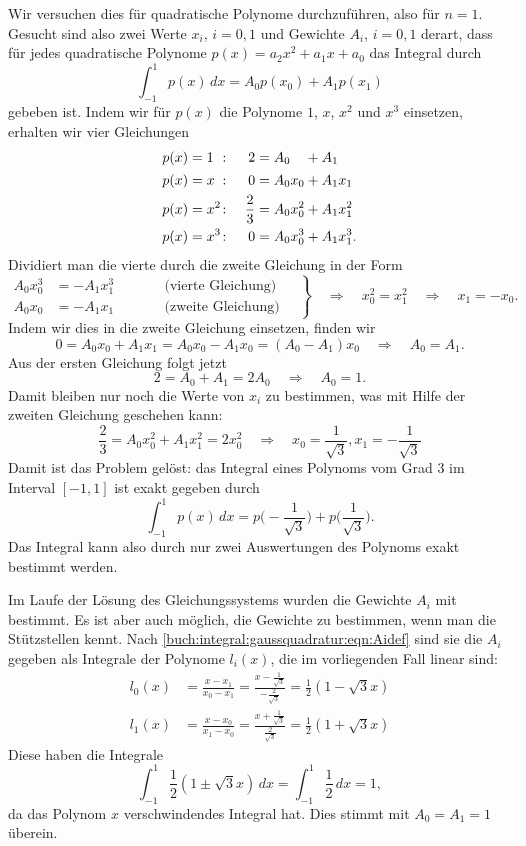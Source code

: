 \begin{beispiel}
Wir versuchen dies für quadratische Polynome durchzuführen, also 
für $n=1$.
Gesucht sind also zwei Werte $x_i$, $i=0,1$ und Gewichte $A_i$, $i=0,1$
derart, dass für jedes quadratische Polynome $p(x)=a_2x^2+a_1x+a_0$ 
das Integral durch
\[
\int_{-1}^1 p(x)\,dx
=
A_0 p(x_0) + A_1 p(x_1)
\]
gebeben ist.
Indem wir für $p(x)$ die Polynome $1$, $x$, $x^2$ und $x^3$ einsetzen,
erhalten wir vier Gleichungen
\[
\begin{aligned}
p(x)&=\rlap{$1$}\phantom{x^2}\colon& 2       &= A_0\phantom{x_0}+ A_1     \\
p(x)&=x^{\phantom{2}}\colon& 0       &= A_0x_0   + A_1x_1  \\
p(x)&=x^2\colon& \frac23 &= A_0x_0^2 + A_1x_1^2\\
p(x)&=x^3\colon& 0       &= A_0x_0^3 + A_1x_1^3.
\end{aligned}
\]
Dividiert man die vierte durch die zweite Gleichung in der Form
\[
\left.
\begin{aligned}
A_0x_0^3 &= -A_1x_1^3 &\qquad&\text{(vierte Gleichung)}\\
A_0x_0   &= -A_1x_1   &\qquad&\text{(zweite Gleichung)}
\end{aligned}
\quad
\right\}
\quad
\Rightarrow
\quad
x_0^2=x_1^2
\quad
\Rightarrow
\quad
x_1=-x_0.
\]
Indem wir dies in die zweite Gleichung einsetzen, finden wir 
\[
0 = A_0x_0 + A_1x_1 = A_0x_0 -A_1x_0 = (A_0-A_1)x_0
\quad\Rightarrow\quad
A_0=A_1.
\]
Aus der ersten Gleichung folgt jetzt
\[
2= A_0+A_1 = 2A_0 \quad\Rightarrow\quad A_0 = 1.
\]
Damit bleiben nur noch die Werte von $x_i$ zu bestimmen, was 
mit Hilfe der zweiten Gleichung geschehen kann:
\[
\frac23 = A_0x_0^2 + A_1x_1^2 = 2x_0^2
\quad\Rightarrow\quad
x_0 = \frac{1}{\sqrt{3}}, x_1 = -\frac{1}{\sqrt{3}}
\]
Damit ist das Problem gelöst: das Integral eines Polynoms vom Grad 3
im Interval $[-1,1]$ ist exakt gegeben durch
\[
\int_{-1}^1 p(x)\,dx
=
p\biggl(-\frac{1}{\sqrt{3}}\biggr)
+
p\biggl(\frac{1}{\sqrt{3}}\biggr).
\]
Das Integral kann also durch nur zwei Auswertungen des Polynoms
exakt bestimmt werden.

Im Laufe der Lösung des Gleichungssystems wurden die Gewichte $A_i$
mit bestimmt.
Es ist aber auch möglich, die Gewichte zu bestimmen, wenn man die
Stützstellen kennt.
Nach \eqref{buch:integral:gaussquadratur:eqn:Aidef}
sind sie die $A_i$ gegeben als Integrale der Polynome
$l_i(x)$, die im vorliegenden Fall linear sind:
\begin{align*}
l_0(x)
&=
\frac{x-x_1}{x_0-x_1}
=
\frac{x-\frac1{\sqrt{3}}}{-\frac{2}{\sqrt{3}}}
=
\frac12(1-\sqrt{3}x)
\\
l_1(x)
&=
\frac{x-x_0}{x_1-x_0}
=
\frac{x+\frac1{\sqrt{3}}}{\frac{2}{\sqrt{3}}}
=
\frac12(1+\sqrt{3}x)
\end{align*}
Diese haben die Integrale
\[
\int_{-1}^1\frac12(1\pm\sqrt{3}x)\,dx
=
\int_{-1}^1 \frac12\,dx
=
1,
\]
da das Polynom $x$ verschwindendes Integral hat.
Dies stimmt mit $A_0=A_1=1$ überein.
\label{buch:integral:beispiel:gaussquadraturn1}
\end{beispiel}

